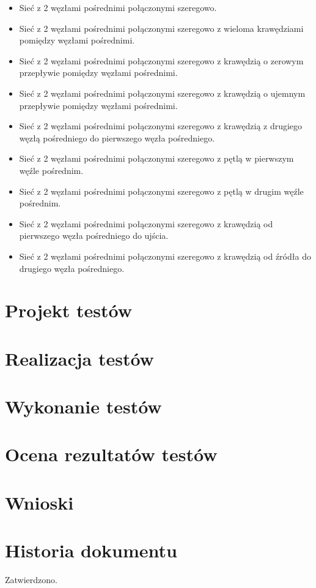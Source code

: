 \documentclass[10pt]{dokument-tiwo}
\begin{document}
\begin{itemize}
    \item Sieć z 2 węzłami pośrednimi połączonymi szeregowo.
    \item Sieć z 2 węzłami pośrednimi połączonymi szeregowo z wieloma krawędziami pomiędzy węzłami pośrednimi.
    \item Sieć z 2 węzłami pośrednimi połączonymi szeregowo z krawędzią o zerowym przepływie pomiędzy węzłami pośrednimi.
    \item Sieć z 2 węzłami pośrednimi połączonymi szeregowo z krawędzią o ujemnym przepływie pomiędzy węzłami pośrednimi.
    \item Sieć z 2 węzłami pośrednimi połączonymi szeregowo z krawędzią z drugiego węzłą pośredniego do pierwszego węzła pośredniego.
    \item Sieć z 2 węzłami pośrednimi połączonymi szeregowo z pętlą w pierwszym węźle pośrednim.
    \item Sieć z 2 węzłami pośrednimi połączonymi szeregowo z pętlą w drugim węźle pośrednim.
    \item Sieć z 2 węzłami pośrednimi połączonymi szeregowo z krawędzią od pierwszego węzła pośredniego do ujścia.
    \item Sieć z 2 węzłami pośrednimi połączonymi szeregowo z krawędzią od źródła do drugiego węzła pośredniego.
\end{itemize}

\section{Projekt testów}


\section{Realizacja testów}


\section{Wykonanie testów}


\section{Ocena rezultatów testów}


\section{Wnioski}


\newpage
\section*{Historia dokumentu}
\begin{versions}
        Zatwierdzono.
\end{versions}
\end{document}
